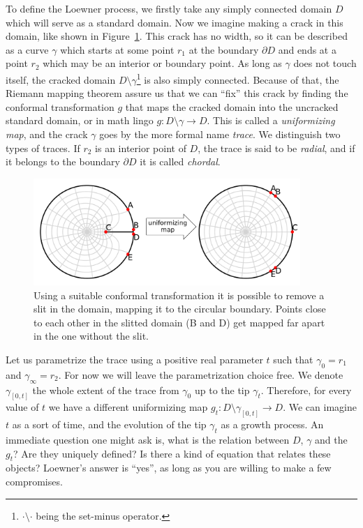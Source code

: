To define the Loewner process, we firstly take any simply connected domain $D$
which will serve as a standard domain. Now we imagine making a crack in this
domain, like shown in Figure~\ref{fig:diskfix}. This crack has no width, so it
can be described as a curve $\gamma$ which starts at some point $r_1$ at the
boundary $\partial D$ and ends at a point $r_2$ which may be an interior or
boundary point. As long as $\gamma$ does not touch itself, the cracked domain
$D\setminus\gamma$\footnote{$\cdot\setminus\cdot$ being the set-minus
    operator.} is also simply connected. Because of that, the Riemann mapping
theorem assure us that we can ``fix'' this crack by finding the conformal
transformation $g$ that maps the cracked domain into the uncracked standard
domain, or in math lingo $g:D\setminus\gamma\rightarrow D$. This is called a
\textit{uniformizing map}, and the crack  $\gamma$ goes by the more formal name
\textit{trace}. We distinguish two types of traces. If $r_2$ is an interior
point of $D$, the trace is said to be \textit{radial}, and if it belongs to the
boundary $\partial D$ it is called \textit{chordal}.

\begin{figure}[t]
\begin{center}
    \includegraphics[width=0.9\textwidth]{chapters/ch4-sle/figs/diskfix}
\end{center}
\caption{Using a suitable conformal transformation it is possible to remove
    a slit in the domain, mapping it to the circular boundary. Points close
    to each other in the slitted domain (B and D) get mapped far apart in
    the one without the slit.}
\label{fig:diskfix}
\end{figure}


Let us parametrize the trace using a positive real parameter $t$ such that
$\gamma_{0}=r_1$ and $\gamma_{\infty}=r_2$. For now we will leave the
parametrization choice free. We denote $\gamma_{[0,t]}$ the whole extent of the
trace from $\gamma_0$ up to the tip $\gamma_t$. Therefore, for every value of
$t$ we have a different uniformizing map
$g_t:D\setminus\gamma_{[0,t]}\rightarrow D$. We can imagine $t$ as a sort of
time, and the evolution of the tip $\gamma_t$ as a growth process.
An immediate question one might ask is, what is the relation between $D$,
$\gamma$ and the $g_t$? Are they uniquely defined? Is there a kind of equation
that relates these objects? Loewner's answer is ``yes'', as long as you are
willing to make a few compromises.

